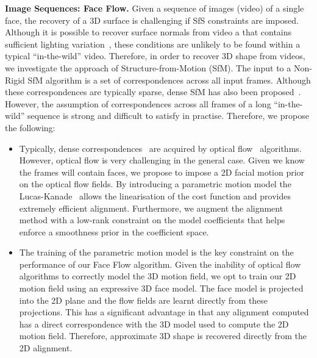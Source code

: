 \textbf{Image Sequences: Face Flow.} Given a sequence of images (video) of
a single face, the recovery of a 3D surface is challenging if SfS constraints
are imposed. Although it is possible to recover surface normals from video a
that contains sufficient lighting variation~\cite{brostow2011video,wenger2005performance,ma2007rapid,jones2011head}, these conditions are unlikely to be found within a typical
``in-the-wild'' video. Therefore, in order to recover 3D shape from videos,
we investigate the approach of Structure-from-Motion (SfM). The input to a 
Non-Rigid SfM algorithm is a set of correspondences across all input frames. 
Although these correspondences are typically sparse, dense SfM has also been
proposed~\cite{garg2013dense,newcombe2011dtam,agudo2014online,fragkiadaki2014grouping}.
However, the assumption of correspondences across all frames of a long 
``in-the-wild'' sequence is strong and difficult to satisfy in practise. 
Therefore, we propose the following:
\begin{itemize}
	\item Typically, dense correspondences~\cite{Garrido:2014gn,agudo2014online} 
	      are acquired by optical flow~\cite{gibson1950perception} algorithms.
	      However, optical flow is very challenging in the general case. Given
	      we know the frames will contain faces, we propose to impose a 
	      2D facial motion prior on the optical flow fields. By introducing
	      a parametric motion model the Lucas-Kanade~\cite{lucas1981iterative}
	      allows the linearisation of the cost function and provides extremely
	      efficient alignment. Furthermore, we augment the alignment method
	      with a low-rank constraint on the model coefficients that helps
	      enforce a smoothness prior in the coefficient space.
	\item The training of the parametric motion model is the key constraint
	      on the performance of our Face Flow algorithm. Given the inability
	      of optical flow algorithms to correctly model the 3D motion field,
	      we opt to train our 2D motion field using an expressive 3D face model.
	      The face model is projected into the 2D plane and the flow fields
	      are learnt directly from these projections. This has a significant
	      advantage in that any alignment computed has a direct correspondence
	      with the 3D model used to compute the 2D motion field. Therefore,
	      approximate 3D shape is recovered directly from the 2D alignment.
\end{itemize}
